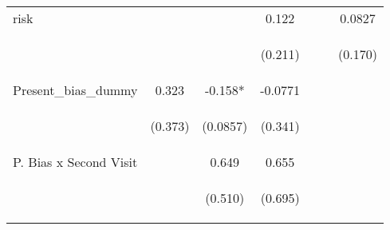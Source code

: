 \begin{center}
\begin{tabular}{lcccccc}
risk &  &  & 0.122 &  &  & 0.0827 \\
\vspace{4pt} & \begin{footnotesize}\end{footnotesize} & \begin{footnotesize}\end{footnotesize} & \begin{footnotesize}(0.211)\end{footnotesize} & \begin{footnotesize}\end{footnotesize} & \begin{footnotesize}\end{footnotesize} & \begin{footnotesize}(0.170)\end{footnotesize} \\
Present\_bias\_dummy & 0.323 & -0.158* & -0.0771 &  &  &  \\
\vspace{4pt} & \begin{footnotesize}(0.373)\end{footnotesize} & \begin{footnotesize}(0.0857)\end{footnotesize} & \begin{footnotesize}(0.341)\end{footnotesize} & \begin{footnotesize}\end{footnotesize} & \begin{footnotesize}\end{footnotesize} & \begin{footnotesize}\end{footnotesize} \\
P. Bias x Second Visit &  & 0.649 & 0.655 &  &  &  \\
\vspace{4pt} & \begin{footnotesize}\end{footnotesize} & \begin{footnotesize}(0.510)\end{footnotesize} & \begin{footnotesize}(0.695)\end{footnotesize} & \begin{footnotesize}\end{footnotesize} & \begin{footnotesize}\end{footnotesize} & \begin{footnotesize}\end{footnotesize} \\

\end{tabular}
\end{center}
